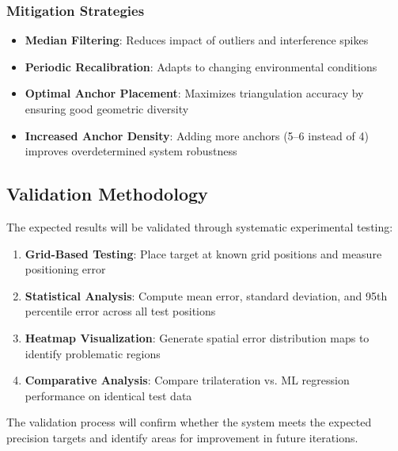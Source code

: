 \subsubsection{Mitigation Strategies}
\begin{itemize}
    \item \textbf{Median Filtering}: Reduces impact of outliers and interference spikes
    \item \textbf{Periodic Recalibration}: Adapts to changing environmental conditions
    \item \textbf{Optimal Anchor Placement}: Maximizes triangulation accuracy by ensuring good geometric diversity
    \item \textbf{Increased Anchor Density}: Adding more anchors (5--6 instead of 4) improves overdetermined system robustness
\end{itemize}

\subsection{Validation Methodology}

The expected results will be validated through systematic experimental testing:

\begin{enumerate}
    \item \textbf{Grid-Based Testing}: Place target at known grid positions and measure positioning error
    \item \textbf{Statistical Analysis}: Compute mean error, standard deviation, and 95th percentile error across all test positions
    \item \textbf{Heatmap Visualization}: Generate spatial error distribution maps to identify problematic regions
    \item \textbf{Comparative Analysis}: Compare trilateration vs. ML regression performance on identical test data
\end{enumerate}

The validation process will confirm whether the system meets the expected precision targets and identify areas for improvement in future iterations.